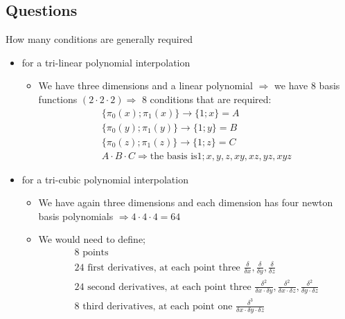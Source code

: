 \subsection{Questions}
How many conditions are generally required
\begin{itemize}
\item for a tri-linear polynomial interpolation
\begin{itemize}
\item We have three dimensions and a linear polynomial $\Rightarrow$ we have 8 basis functions $(2\cdot 2 \cdot 2)\Rightarrow$ 8 conditions that are required:
$$
\begin{aligned}
\{\pi_0(x);\pi_1(x)\} \rightarrow \{1;x\}=A\\
\{\pi_0(y);\pi_1(y)\} \rightarrow \{1;y\}=B\\
\{\pi_0(z);\pi_1(z)\} \rightarrow \{1;z\}=C\\
A\cdot B\cdot C \Rightarrow \text{the basis is} 1;x,y,z,xy,xz,yz,xyz
\end{aligned}
$$
\end{itemize}
\item for a tri-cubic polynomial interpolation
\begin{itemize}
\item We have again three dimensions and each dimension has four newton basis polynomials $\Rightarrow 4 \cdot 4 \cdot 4 =64$
\item We would need to define;
$$
\begin{aligned}
8\text{ points}\\
24 \text{ first derivatives, at each point three }\frac{\delta}{\delta x},\frac{\delta}{\delta y} ,\frac{\delta}{\delta z} \\
24 \text{ second derivatives, at each point three }\frac{\delta^2}{\delta x \cdot \delta y},\frac{\delta^2}{\delta x \cdot \delta z} ,\frac{\delta^2}{\delta y \cdot \delta z}\\
8 \text{ third derivatives, at each point one }\frac{\delta^3}{\delta x \cdot \delta y \cdot \delta z}
\end{aligned}
$$
\end{itemize}
\end{itemize}